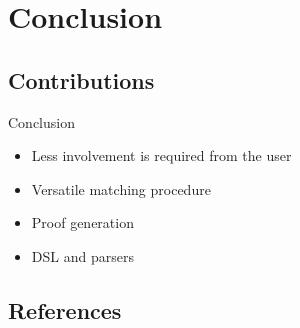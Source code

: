 \section{Conclusion}


\subsection{Contributions}

\begin{frame}{Conclusion}

\begin{itemize}
\item Less involvement is required from the user
\item Versatile matching procedure
\item Proof generation
\item DSL and parsers
\end{itemize}


\end{frame}

\subsection{References}

